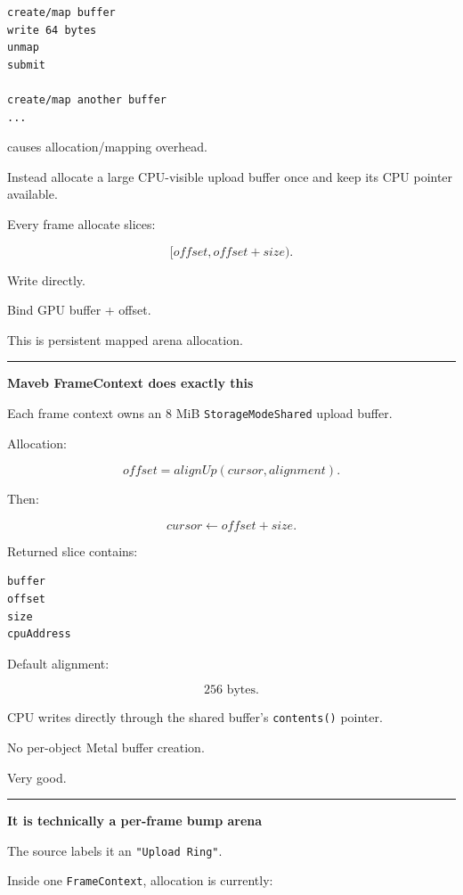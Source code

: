 \protect{}\label{p10-map-everything}%
\begin{verbatim}
create/map buffer
write 64 bytes
unmap
submit

create/map another buffer
...
\end{verbatim}

causes allocation/mapping overhead.

Instead allocate a large CPU-visible upload buffer once and keep its CPU pointer available.

Every frame allocate slices:

\[
[offset,offset+size).
\]

Write directly.

Bind GPU buffer + offset.

This is persistent mapped arena allocation.

\begin{center}\rule{0.5\linewidth}{0.5pt}\end{center}

\textbf{Maveb FrameContext does exactly this}

Each frame context owns an 8 MiB \texttt{StorageModeShared} upload buffer.

Allocation:

\[
offset=
alignUp(cursor,alignment).
\]

Then:

\[
cursor\leftarrow offset+size.
\]

Returned slice contains:

\protect{}\label{p10-slice}%
\begin{verbatim}
buffer
offset
size
cpuAddress
\end{verbatim}

Default alignment:

\[
256\text{ bytes}.
\]

CPU writes directly through the shared buffer's \texttt{contents()} pointer.

No per-object Metal buffer creation.

Very good.

\begin{center}\rule{0.5\linewidth}{0.5pt}\end{center}

\textbf{It is technically a per-frame bump arena}

The source labels it an \texttt{"Upload\ Ring"}.

Inside one \texttt{FrameContext}, allocation is currently:


